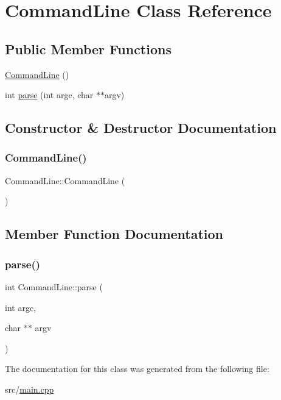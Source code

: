 \hypertarget{class_command_line}{}\section{Command\+Line Class Reference}
\label{class_command_line}
\subsection*{Public Member Functions}
\begin{DoxyCompactItemize}
\item 
\mbox{\hyperlink{class_command_line_ae6329212e2108a9e2a1795f27fab33eb}{Command\+Line}} ()
\item 
int \mbox{\hyperlink{class_command_line_a2913777c6901516fe704d0dd546a70c9}{parse}} (int argc, char $\ast$$\ast$argv)
\end{DoxyCompactItemize}


\subsection{Constructor \& Destructor Documentation}
\mbox{\label{class_command_line_ae6329212e2108a9e2a1795f27fab33eb}} 
\subsubsection{\texorpdfstring{Command\+Line()}{CommandLine()}}
{\footnotesize\ttfamily Command\+Line\+::\+Command\+Line (\begin{DoxyParamCaption}{ }\end{DoxyParamCaption})\hspace{0.3cm}{\ttfamily [inline]}}



\subsection{Member Function Documentation}
\mbox{\label{class_command_line_a2913777c6901516fe704d0dd546a70c9}} 
\subsubsection{\texorpdfstring{parse()}{parse()}}
{\footnotesize\ttfamily int Command\+Line\+::parse (\begin{DoxyParamCaption}\item[{int}]{argc,  }\item[{char $\ast$$\ast$}]{argv }\end{DoxyParamCaption})\hspace{0.3cm}{\ttfamily [inline]}}



The documentation for this class was generated from the following file\+:\begin{DoxyCompactItemize}
\item 
src/\mbox{\hyperlink{main_8cpp}{main.\+cpp}}\end{DoxyCompactItemize}
